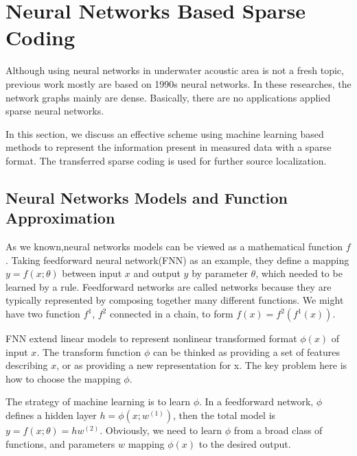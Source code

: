 \section{Neural Networks Based Sparse Coding}
Although using neural networks in underwater acoustic area is not a fresh topic, previous work\cite{maccato1989neural,ghosh1992neural,steinberg1991neural,niu2017source}
mostly are based on 1990s neural networks. In these researches, the network graphs mainly are dense. Basically, there are no applications applied sparse neural networks.

In this section, we discuss an effective scheme using machine learning based methods to represent the information present in measured data with a sparse format. The transferred sparse coding is used for further source localization.

\subsection{Neural Networks Models and Function Approximation}
As we known,neural networks models can be viewed as a mathematical function $f$. Taking feedforward neural network(FNN) as an example, they define a mapping ${{y}}=f(x;\theta )$ between input $x$ and output $y$ by parameter $\theta$, which needed to be learned by a rule. Feedforward networks are called networks because they are typically represented by composing together many different functions. We might have two function $f^{1}$, $f^{2}$ connected in a chain\cite{goodfellow2016deep}, to form
$f(x) = f^{2}(f^{1}(x))$.

FNN extend linear models to represent nonlinear transformed format $\phi(x)$ of input $x$. The transform function $\phi$ can be thinked as providing a set of features describing $x$, or as providing a new representation for x. The key problem here is how to choose the mapping $\phi$.

The strategy of machine learning is to learn $\phi$. In a feedforward network, $\phi$ defines a hidden layer $h=\phi(x;w^{(1)})$, then the total model is $y=f(x;\theta)=hw^{(2)}$.
Obviously, we need to learn $\phi$ from a broad class of functions, and parameters $w$ mapping $\phi(x)$ to the desired output.

